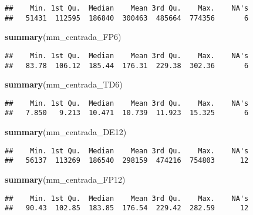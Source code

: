 \documentclass[]{article}
\newenvironment{Shaded}{\begin{snugshade}}{\end{snugshade}}
\newcommand{\KeywordTok}[1]{\textcolor[rgb]{0.13,0.29,0.53}{\textbf{#1}}}
\newcommand{\NormalTok}[1]{#1}
\begin{document}
\begin{verbatim}
##    Min. 1st Qu.  Median    Mean 3rd Qu.    Max.    NA's 
##   51431  112595  186840  300463  485664  774356       6
\end{verbatim}

\begin{Shaded}
\begin{Highlighting}[]
\KeywordTok{summary}\NormalTok{(mm_centrada_FP6)}
\end{Highlighting}
\end{Shaded}

\begin{verbatim}
##    Min. 1st Qu.  Median    Mean 3rd Qu.    Max.    NA's 
##   83.78  106.12  185.44  176.31  229.38  302.36       6
\end{verbatim}

\begin{Shaded}
\begin{Highlighting}[]
\KeywordTok{summary}\NormalTok{(mm_centrada_TD6)}
\end{Highlighting}
\end{Shaded}

\begin{verbatim}
##    Min. 1st Qu.  Median    Mean 3rd Qu.    Max.    NA's 
##   7.850   9.213  10.471  10.739  11.923  15.325       6
\end{verbatim}

\begin{Shaded}
\begin{Highlighting}[]
\KeywordTok{summary}\NormalTok{(mm_centrada_DE12)}
\end{Highlighting}
\end{Shaded}

\begin{verbatim}
##    Min. 1st Qu.  Median    Mean 3rd Qu.    Max.    NA's 
##   56137  113269  186540  298159  474216  754803      12
\end{verbatim}

\begin{Shaded}
\begin{Highlighting}[]
\KeywordTok{summary}\NormalTok{(mm_centrada_FP12)}
\end{Highlighting}
\end{Shaded}

\begin{verbatim}
##    Min. 1st Qu.  Median    Mean 3rd Qu.    Max.    NA's 
##   90.43  102.85  183.85  176.54  229.42  282.59      12
\end{verbatim}
\end{document}
